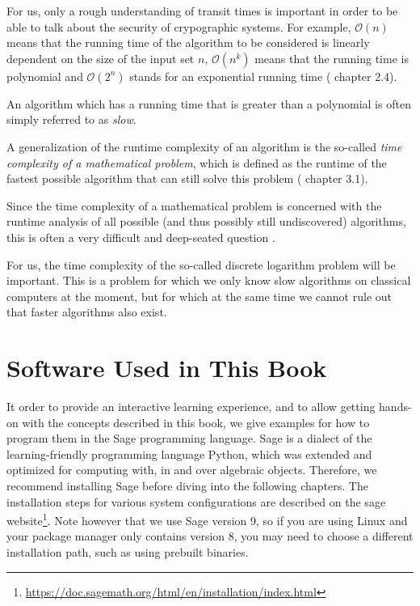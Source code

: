 For us, only a rough understanding of transit times is important in order to be able to talk about the security of crypographic systems. For example, $\mathcal{O}(n)$ means that the running time of the algorithm to be considered is linearly dependent on the size of the input set $n$, $\mathcal{O}(n^k)$ means that the running time is polynomial and $\mathcal{O}(2^n) $ stands for an exponential running time (%
chapter 2.4).


An algorithm which has a running time that is greater than a polynomial is often simply referred to as \textit{slow}.

A generalization of the runtime complexity of an algorithm is the so-called \textit{time complexity of a mathematical problem}, which is defined as the runtime of the fastest possible algorithm that can still solve this problem (
chapter 3.1).

Since the time complexity of a mathematical problem is concerned with the runtime analysis of all possible (and thus possibly still undiscovered) algorithms, this is often a very difficult and deep-seated question .

For us, the time complexity of the so-called discrete logarithm problem will be important. This is a problem for which we only know slow algorithms on classical computers at the moment, but for which at the same time we cannot rule out that faster algorithms also exist.

\section{Software Used in This Book}

\newcommand{\icode}[1]{\lstinline{#1}}

It order to provide an interactive learning experience, and to allow getting
hands-on with the concepts described in this book, we give examples for how
to program them in the Sage programming language.
Sage is a dialect of the learning-friendly programming language Python, which
was extended and optimized for computing with, in and over algebraic objects.
Therefore, we recommend installing Sage before diving into the following
chapters.
The installation steps for various system configurations are described on the sage website\footnote{\url{https://doc.sagemath.org/html/en/installation/index.html}}.
Note however that we use Sage version 9, so if you are using Linux and your package manager only contains version 8, you may need to choose a different installation path, such as using prebuilt binaries.
